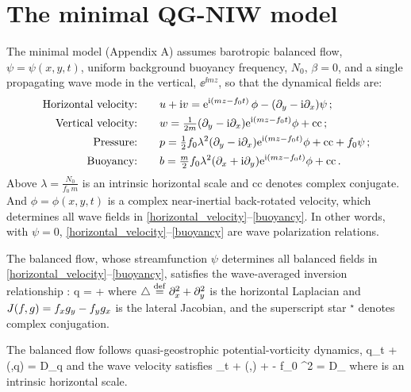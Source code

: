 \documentclass{jfm}
\begin{document}
\section{The \cite{xie_vanneste2015} minimal QG-NIW model}
The \cite{xie_vanneste2015} minimal model (Appendix A) assumes
barotropic balanced flow, $\psi=\psi(x,y,t)$,
uniform background buoyancy frequency, $N_0$, $\beta=0$, and a single propagating
wave mode in the vertical, $\ee^{\ii m z}$, so that the dynamical fields are:
\begin{align}
\label{horizontal_velocity}
\text{Horizontal velocity:}&\qquad u + {\rm i} v  = {\rm e}^{{\rm i} (m z - f_0 t)}\,\phi -(\partial_y-{\rm i}\partial_x)\psi\,;\\
  \label{vertical_velocity}
\text{Vertical velocity:}&\qquad  w = \tfrac{1}{2 m} (\partial_y-{\rm i}\partial_x){\rm e}^{{\rm i} (m z - f_0 t)}\phi  + \text{cc}  \,;\\
\label{pressure}
\text{Pressure:}&\qquad p = \tfrac{1}{2} f_0\lambda^2 (\partial_y-{\rm i}\partial_x){\rm e}^{{\rm i} (m z - f_0 t)}\phi
+\text{cc} + f_0 \psi \,;\\
\label{buoyancy}
\text{Buoyancy:}&\qquad b =  \tfrac{m}{2} f_0\lambda^2 (\partial_x+{\rm i}\partial_y){\rm e}^{{\rm i} (m z - f_0 t)}\phi + \text{cc}
  \, .
\end{align}
Above $\lambda = \tfrac{N_0}{f_0\, m}$ is an intrinsic horizontal scale and cc denotes
complex conjugate. And $\phi = \phi(x,y,t)$ is a complex near-inertial back-rotated velocity,
which determines all wave fields in \eqref{horizontal_velocity}--\eqref{buoyancy}.
In other words, with $\psi=0$, \eqref{horizontal_velocity}--\eqref{buoyancy}
are wave polarization relations.

The balanced flow,
whose streamfunction $\psi$ determines all balanced fields in
\eqref{horizontal_velocity}--\eqref{buoyancy}, satisfies the
wave-averaged inversion relationship
\citep[cf. ][]{wagner_young2015}:
\beq
\label{qgpv}
q = \lap \psi +
                 \com
\eeq
where $\triangle \stackrel{\mathrm{def}}{=} \partial_x^2 + \partial_y^2$ is the horizontal
Laplacian and $J(f,g)=f_x g_y - f_y g_x$ is the lateral Jacobian, and
the superscript star $^\star$ denotes complex conjugation.

The balanced flow follows quasi-geostrophic potential-vorticity dynamics,
\beq
\label{macroturb}
q_t + \sJ(\psi,q) = D_q\com
\eeq
and the wave velocity satisfies
\beq
\label{waves}
\phi_t + \sJ(\psi,\phi) + \phi\lap \psi -  f_0 \lambda^2 \lap \phi
 = D_\phi\com
\eeq
where   is an intrinsic horizontal scale.
\end{document}
